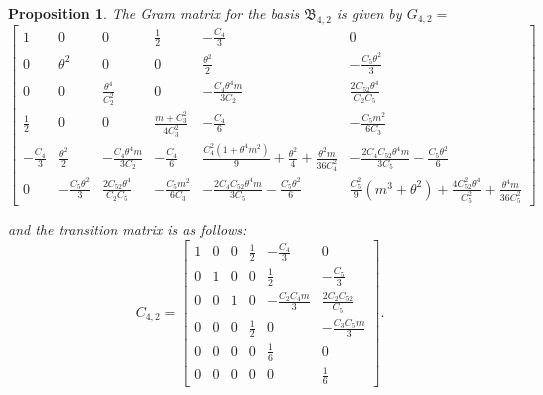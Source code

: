 \documentclass[table]{amsart}
\newtheorem{proposition}[theorem]{Proposition}
\numberwithin{equation}{section}
\begin{document}
\begin{proposition}
    The Gram matrix for the basis $\mathfrak{B}_{4,2}$ is given by $G_{4, 2}=$
    \[
\begin{bmatrix}
1 
& 0 
& 0 
& \tfrac12 
& -\tfrac{C_4}{3} 
& 0 \\[8pt]

0 
& \theta^2 
& 0 
& 0 
& \tfrac{\theta^2}{2 } 
& -\tfrac{C_5 \theta^2}{3 } \\[8pt]

0 
& 0 
& \tfrac{\theta^4}{C_2^2} 
& 0 
& -\tfrac{C_4 \theta^4 m}{3 C_2} 
& \tfrac{2 C_{52} \theta^4}{C_2 C_5} \\[8pt]

\tfrac12 
& 0 
& 0 
& \tfrac{m+C_3^2}{4C_3^2}
& -\tfrac{C_4}{6} 
& -\tfrac{C_5 m^2}{6 C_3} \\[8pt]

-\tfrac{C_4}{3} 
& \tfrac{\theta^2}{2 } 
& -\tfrac{C_4 \theta^4 m}{3 C_2} 
& -\tfrac{C_4}{6} 
& \tfrac{C_4^2(1+\theta^4 m^2)}{9}
  + \tfrac{\theta^2}{4 }
  + \tfrac{\theta^2 m}{36 C_4^2} 
& -\tfrac{2 C_4 C_{52} \theta^4 m}{3 C_5}
  - \tfrac{C_5 \theta^2}{6 } \\[8pt]

0 
& -\tfrac{C_5 \theta^2}{3 } 
& \tfrac{2 C_{52} \theta^4}{C_2 C_5} 
& -\tfrac{C_5 m^2}{6 C_3} 
& -\tfrac{2 C_4 C_{52} \theta^4 m}{3 C_5}
  - \tfrac{C_5 \theta^2}{6 } 
& \tfrac{C_5^2}{9}\!\left(m^3+\theta^2\right)
  + \tfrac{4 C_{52}^2 \theta^4}{C_5^2}
  + \tfrac{\theta^4 m}{36 C_5^2}
\end{bmatrix}
\]

and the transition matrix is as follows:
\[C_{4,2}=
\begin{bmatrix}
1 & 0 & 0 & \tfrac{1}{2} & -\tfrac{C_4}{3} & 0 \\[8pt]
0 & 1 & 0 & 0 & \tfrac{1}{2} & -\tfrac{C_5}{3} \\[8pt]
0 & 0 & 1 & 0 & -\tfrac{C_2 C_4 m}{3} & \tfrac{2 C_2 C_{52}}{C_5} \\[8pt]
0 & 0 & 0 & \tfrac{1}{2} & 0 & -\tfrac{C_3 C_5 m}{3} \\[8pt]
0 & 0 & 0 & 0 & \tfrac{1}{6} & 0 \\[8pt]
0 & 0 & 0 & 0 & 0 & \tfrac{1}{6}
\end{bmatrix}.
\]
\end{proposition}
\end{document}
